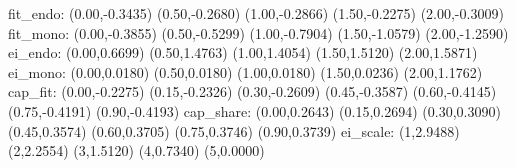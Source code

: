 fit_endo: (0.00,-0.3435) (0.50,-0.2680) (1.00,-0.2866) (1.50,-0.2275) (2.00,-0.3009)
fit_mono: (0.00,-0.3855) (0.50,-0.5299) (1.00,-0.7904) (1.50,-1.0579) (2.00,-1.2590)
ei_endo:  (0.00,0.6699) (0.50,1.4763) (1.00,1.4054) (1.50,1.5120) (2.00,1.5871)
ei_mono:  (0.00,0.0180) (0.50,0.0180) (1.00,0.0180) (1.50,0.0236) (2.00,1.1762)
cap_fit:   (0.00,-0.2275) (0.15,-0.2326) (0.30,-0.2609) (0.45,-0.3587) (0.60,-0.4145) (0.75,-0.4191) (0.90,-0.4193)
cap_share: (0.00,0.2643) (0.15,0.2694) (0.30,0.3090) (0.45,0.3574) (0.60,0.3705) (0.75,0.3746) (0.90,0.3739)
ei_scale: (1,2.9488) (2,2.2554) (3,1.5120) (4,0.7340) (5,0.0000)
